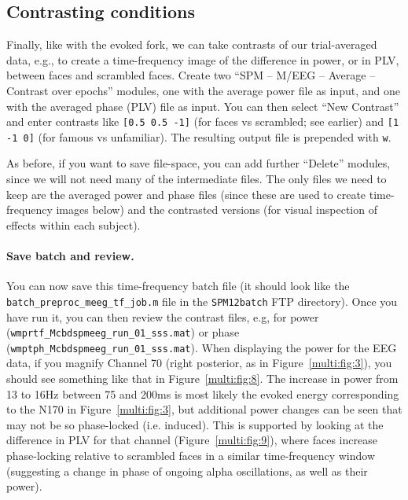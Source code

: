 \subsection{Contrasting conditions}

Finally, like with the evoked fork, we can take contrasts of our trial-averaged data, e.g., to create a time-frequency image of the difference in power, or in PLV, between faces and scrambled faces. Create two ``SPM -- M/EEG -- Average -- Contrast over epochs'' modules, one with the average power file as input, and one with the averaged phase (PLV) file as input. You can then select ``New Contrast'' and enter contrasts like \texttt{[0.5 0.5 -1]} (for faces vs scrambled; see earlier) and \texttt{[1 -1 0]} (for famous vs unfamiliar). The resulting output file is prepended with \texttt{w}.

As before, if you want to save file-space, you can add further ``Delete'' modules, since we will not need many of the intermediate files. The only files we need to keep are the averaged power and phase files (since these are used to create time-frequency images below) and the contrasted versions (for visual inspection of effects within each subject).

\paragraph{Save batch and review.}

You can now save this time-frequency batch file (it should look like the \texttt{batch\_preproc\_meeg\_tf\_job.m} file in the \texttt{SPM12batch} FTP directory). Once you have run it, you can then review the contrast files, e.g, for power (\texttt{wmprtf\_Mcbdspmeeg\_run\_01\_sss.mat}) or phase (\texttt{wmptph\_Mcbdspmeeg\_run\_01\_sss.mat}). When displaying the power for the EEG data, if you magnify Channel 70 (right posterior, as in Figure~\ref{multi:fig:3}), you should see something like that in Figure~\ref{multi:fig:8}. The increase in power from 13 to 16Hz between 75 and 200ms is most likely the evoked energy corresponding to the N170 in Figure~\ref{multi:fig:3}, but additional power changes can be seen that may not be so phase-locked (i.e. induced). This is supported by looking at the difference in PLV for that channel (Figure~\ref{multi:fig:9}), where faces increase phase-locking relative to scrambled faces in a similar time-frequency window (suggesting a change in phase of ongoing alpha oscillations, as well as their power).

